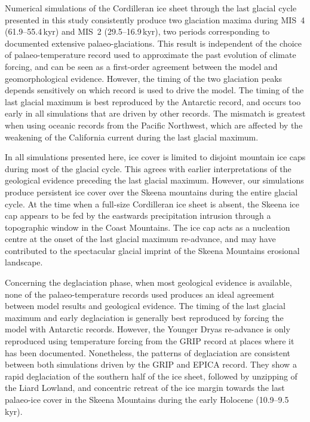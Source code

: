 \documentclass[tc, manuscript]{copernicus}
\begin{document}
\conclusions
\label{sec:concl}

Numerical simulations of the Cordilleran ice sheet through the last glacial
cycle presented in this study consistently produce two glaciation maxima during
MIS~4 (61.9--55.4\,kyr) and MIS~2 (29.5--16.9\,kyr), two periods
corresponding to documented extensive palaeo-glaciations. This result is
independent of the choice of palaeo-temperature record used to approximate the
past evolution of climate forcing, and
can be seen as a first-order agreement between the model and geomorphological
evidence. However, the timing of the two glaciation peaks depends sensitively
on which record
is used to drive the model. The timing of the last glacial maximum is best
reproduced by the Antarctic record, and occurs too early in all simulations
that are driven by other records. The mismatch is greatest when using
oceanic records from the Pacific Northwest, which are affected by the
weakening of the California current during the last glacial maximum.

In all simulations presented here, ice cover is limited to disjoint mountain ice
caps during most of the glacial cycle. This agrees with earlier interpretations
of the geological evidence preceding the last glacial maximum. However, our
simulations produce persistent ice cover over the Skeena mountains during
the entire glacial cycle. At the time when a full-size Cordilleran ice sheet is
absent, the Skeena ice cap appears to be fed by the eastwards precipitation
intrusion through a topographic window in the Coast Mountains. The ice cap acts
as a nucleation centre at the onset of the last glacial maximum re-advance, and
may have contributed to the spectacular glacial imprint of the Skeena Mountains
erosional landscape.

Concerning the deglaciation phase, when most geological evidence is available,
none of the palaeo-temperature records used produces an ideal agreement between
model results and geological evidence. The timing of the last glacial maximum
and early deglaciation is generally best reproduced by forcing the model with
Antarctic records. However, the Younger Dryas re-advance is only reproduced
using temperature forcing from the GRIP record at places where it has been
documented. Nonetheless, the patterns of deglaciation are consistent between
both simulations driven by the GRIP and EPICA record. They show a rapid
deglaciation of the southern half of the ice
sheet, followed by unzipping of the Liard Lowland, and concentric retreat of
the ice margin towards the last palaeo-ice cover in the Skeena Mountains
during the early Holocene (10.9--9.5\,kyr).
\end{document}

